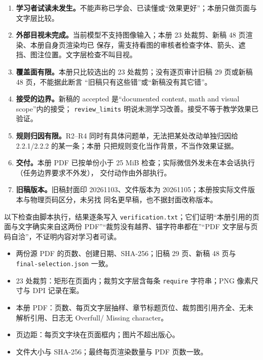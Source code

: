 \documentclass[11pt]{ctexart}
\begin{document}

\begin{enumerate}
\item \textbf{学习者试读未发生。}不能声称已学会、已读懂或“效果更好”；本册只做页面与文字层比较。
\item \textbf{外部目视未完成。}当前模型不支持图像输入；本册 23 处裁剪、新稿 48 页渲染、本册自身页渲染均已
保存，需支持看图的审核者检查字体、箭头、遮挡、图注位置。文字层检查不叫目视。
\item \textbf{覆盖面有限。}本册只比较选出的 23 处裁剪；没有逐页审计旧稿 29 页或新稿 48 页，不能据此断言
“旧稿只有这些错”或“新稿没有其它错”。
\item \textbf{接受的边界。}新稿的 accepted 是“documented content, math and visual scope”内的接受；
\texttt{review\_limits} 明说未测学习改善。接受不等于教学效果已验证。
\item \textbf{规则归因有限。}R2--R4 同时有具体问题单，无法把某处改动单独归因给 2.2.1/2.2.2 的某一条；本册
只把规则变化当作背景，不当作效果证据。
\item \textbf{交付。}本册 PDF 已按单份小于 25 MiB 检查；实际微信外发未在本会话执行（任务边界要求不外发），
交付动作由外部执行。
\item \textbf{旧稿版本。}旧稿封面印 20261103、文件版本为 20261105；本册按实际文件版本与物理页码区分，未另找
同名更早稿，也不据封面改称版本。
\end{enumerate}

\clearpage
{}

以下检查由脚本执行，结果逐条写入 \texttt{verification.txt}；它们证明“本册引用的页面与文字确实来自这两份
PDF”“裁剪没有越界、锚字符串都在”“PDF 文字层与页码自洽”，不证明内容对学习者可读。

\begin{itemize}
\item 两份源 PDF 的页数、创建日期、SHA-256；旧稿 29 页、新稿 48 页与 \texttt{final-selection.json} 一致。
\item 23 处裁剪：矩形在页面内；裁剪文字层含每条 \texttt{require} 字符串；PNG 像素尺寸与 DPI 记录在案。
\item 本册 PDF：页数、每页文字层抽样、章节标题页位、裁剪图引用齐全、无未解析引用、日志无 Overfull/
Missing character。
\item 页边距：每页文字块在页面框内；图片不超出版心。
\item 文件大小与 SHA-256；最终每页渲染数量与 PDF 页数一致。
\end{itemize}
\end{document}
